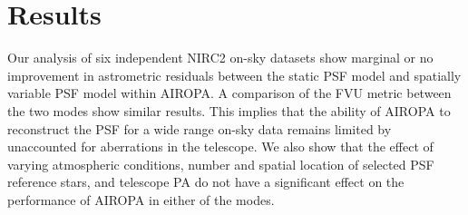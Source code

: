 \documentclass[]{spie}  %
\begin{document}

\section{Results} \label{sec:fvu-astrom-results}
Our analysis of six independent NIRC2 on-sky datasets show marginal or no improvement in astrometric residuals between the static PSF model and spatially variable PSF model within AIROPA. A comparison of the FVU metric between the two modes show similar results. This implies that the ability of AIROPA to reconstruct the PSF for a wide range on-sky data remains limited by unaccounted for aberrations in the telescope. We also show that the effect of varying atmospheric conditions, number and spatial location of selected PSF reference stars, and telescope PA do not have a significant effect on the performance of AIROPA in either of the modes.
\end{document}
